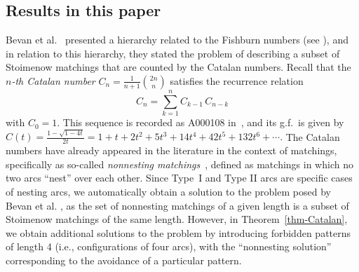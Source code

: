 \documentclass[11pt]{article}
\begin{document}
	\subsection{Results in this paper}
	Bevan et al.~\cite{Bevan-Cheon-Kitaev} presented a hierarchy related to the Fishburn numbers (see \cite[Fig.~12]{Bevan-Cheon-Kitaev}), and in relation to this hierarchy, they stated the problem of describing a subset of Stoimenow matchings that are counted by the Catalan numbers. 
	Recall that the {\it $n$-th Catalan number} $C_n=\frac{1}{n+1}{2n\choose n}$ satisfies the recurrence relation
	\begin{equation}\label{Catalan-rec}
		C_n= \displaystyle\sum_{k=1}^{n} C_{k-1}\,C_{n-k}
	\end{equation}
	with $C_0=1$. This sequence is recorded as A000108 in~\cite{OEIS}, and its g.f.\ is given by 
	\(
	C(t)=\frac{1-\sqrt{1-4t}}{2t}=1+t+2t^2+5t^3+14t^4+42t^5+132t^6+\cdots.
	\)
	The Catalan numbers have already appeared in the literature in the context of matchings, specifically as so-called \emph{nonnesting matchings}~\cite{Stanley}, defined as matchings in which no two arcs ``nest'' over each other.
	Since Type~I and Type II arcs are specific cases of nesting arcs, we automatically obtain a solution to the problem posed by Bevan et al. \cite{Bevan-Cheon-Kitaev}, as the set of nonnesting matchings of a given length is a subset of Stoimenow matchings of the same length. However, in Theorem~\ref{thm-Catalan}, we obtain additional solutions to the problem by introducing forbidden patterns of length 4 (i.e., configurations of four arcs), with the ``nonnesting solution'' corresponding to the avoidance of a particular pattern.
	
\end{document}
